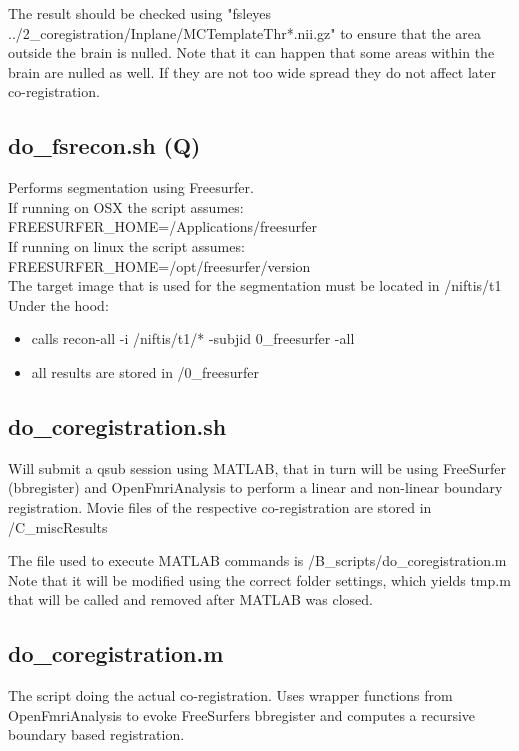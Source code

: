 \documentclass[12pt,a4paper]{scrartcl}
\begin{document}
\noindent The result should be checked using "fsleyes ../2\_coregistration/Inplane/MCTemplateThr*.nii.gz" to ensure that the area outside the brain is nulled. Note that it can happen that some areas within the brain are nulled as well. If they are not too wide spread they do not affect later co-registration.

\subsection{do\_fsrecon.sh (Q)}
\label{sec:fsrecon}
Performs segmentation using Freesurfer.\\

\noindent If running on OSX the script assumes:\\
\noindent FREESURFER\_HOME=/Applications/freesurfer\\

\noindent If running on linux the script assumes:\\
\noindent FREESURFER\_HOME=/opt/freesurfer/version\\

\noindent The target image that is used for the segmentation must be located in /niftis/t1\\

\noindent Under the hood:
\begin{itemize}
\item calls recon-all -i /niftis/t1/* -subjid  0\_freesurfer -all
\item all results are stored in /0\_freesurfer
\end{itemize}

\subsection{do\_coregistration.sh}
\label{sec:coreg}
Will submit a qsub session using MATLAB, that in turn will be using FreeSurfer (bbregister) and OpenFmriAnalysis to perform a linear and non-linear boundary registration.  Movie files of the respective co-registration are stored in /C\_miscResults

\noindent The file used to execute MATLAB commands is /B\_scripts/do\_coregistration.m Note that it will be modified using the correct folder settings, which yields tmp.m that will be called and removed after MATLAB was closed.\\

\subsection{do\_coregistration.m}
The script doing the actual co-registration. Uses wrapper functions from OpenFmriAnalysis to evoke FreeSurfers bbregister and computes a recursive boundary based registration.\\
\end{document}

